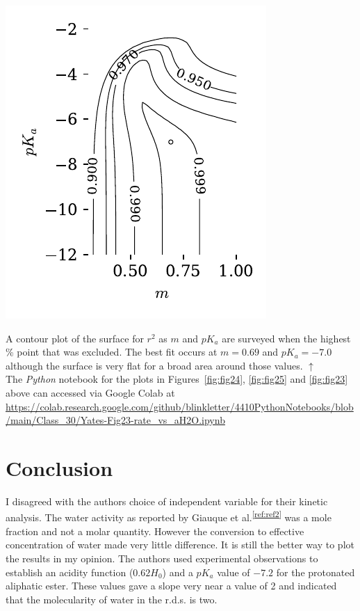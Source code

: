 \documentclass[]{tufte-handout}
\begin{document}
\begin{marginfigure}[0mm]
  \centering
  \includegraphics[scale=0.7]{images/fig23}
  \caption{A contour plot of the surface for $r^2$ as $m$ and $pK_a$ are surveyed when the highest \% point that was excluded. The best fit occurs at $m = 0.69$ and $pK_a = -7.0$ although the surface is very flat for a broad area around those values. $\uparrow$ \\ \vspace{3mm} The \textit{Python} notebook for the plots in Figures~\ref{fig:fig24}, \ref{fig:fig25} and \ref{fig:fig23} above can accessed via Google Colab at \url{https://colab.research.google.com/github/blinkletter/4410PythonNotebooks/blob/main/Class_30/Yates-Fig23-rate_vs_aH2O.ipynb}} 
  \label{fig:fig23}
\end{marginfigure}

\section{Conclusion}

I disagreed with the authors choice of independent variable for their kinetic analysis. The water activity as reported by Giauque et al.\textsuperscript{\ref{ref:ref2}} was a mole fraction and not a molar quantity. However the conversion to effective concentration of water made very little difference. It is still the better way to plot the results in my opinion. The authors used experimental observations to establish an acidity function ($0.62H_0$) and a $pK_a$ value of $-7.2$ for the protonated aliphatic ester. These values gave a slope very near a value of 2 and indicated that the molecularity of water in the r.d.s. is two.
\end{document}
